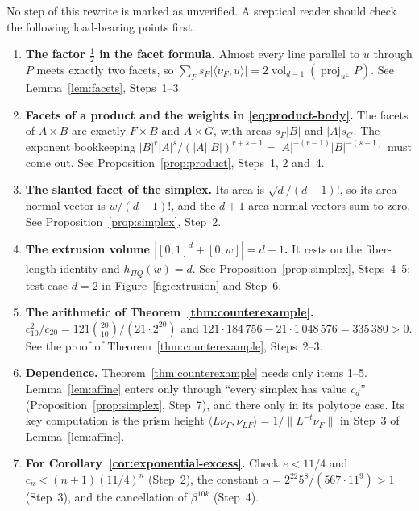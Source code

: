 \documentclass[11pt]{article}
\DeclareMathOperator{\vol}{vol}
\DeclareMathOperator{\proj}{proj}
\begin{document}
No step of this rewrite is marked as unverified. A sceptical reader should
check the following load-bearing points first.
\begin{enumerate}[leftmargin=2em,itemsep=3pt]
\item \textbf{The factor \(\tfrac12\) in the facet formula.} Almost every
 line parallel to \(u\) through \(P\) meets exactly two facets, so
 \(\sum_Fs_F|\langle\nu_F,u\rangle|=2\vol_{d-1}(\proj_{u^\perp}P)\).
 See Lemma~\ref{lem:facets}, Steps~1--3.
\item \textbf{Facets of a product and the weights in
 \eqref{eq:product-body}.} The facets of \(A\times B\) are exactly
 \(F\times B\) and \(A\times G\), with areas \(s_F|B|\) and \(|A|s_G\).
 The exponent bookkeeping
 \(|B|^r|A|^s/(|A||B|)^{r+s-1}=|A|^{-(r-1)}|B|^{-(s-1)}\) must come out.
 See Proposition~\ref{prop:product}, Steps~1, 2 and~4.
\item \textbf{The slanted facet of the simplex.} Its area is
 \(\sqrt d/(d-1)!\), so its area-normal vector is \(w/(d-1)!\), and the
 \(d+1\) area-normal vectors sum to zero. See
 Proposition~\ref{prop:simplex}, Step~2.
\item \textbf{The extrusion volume \(|[0,1]^d+[0,w]|=d+1\).} It rests on
 the fiber-length identity and \(h_{\Pi Q}(w)=d\). See
 Proposition~\ref{prop:simplex}, Steps~4--5; test case \(d=2\) in
 Figure~\ref{fig:extrusion} and Step~6.
\item \textbf{The arithmetic of Theorem~\ref{thm:counterexample}.}
 \(c_{10}^2/c_{20}=121\binom{20}{10}/(21\cdot2^{20})\) and
 \(121\cdot184\,756-21\cdot1\,048\,576=335\,380>0\). See the proof of
 Theorem~\ref{thm:counterexample}, Steps~2--3.
\item \textbf{Dependence.} Theorem~\ref{thm:counterexample} needs only
 items 1--5. Lemma~\ref{lem:affine} enters only through ``every simplex
 has value \(c_d\)'' (Proposition~\ref{prop:simplex}, Step~7), and there
 only in its polytope case. Its key computation is the prism height
 \(\langle L\nu_F,\nu_{LF}\rangle=1/\|L^{-t}\nu_F\|\) in Step~3 of
 Lemma~\ref{lem:affine}.
\item \textbf{For Corollary~\ref{cor:exponential-excess}.} Check
 \(e<11/4\) and \(c_n<(n+1)(11/4)^n\) (Step~2), the constant
 \(\alpha=2^{22}5^8/(567\cdot11^9)>1\) (Step~3), and the cancellation of
 \(\beta^{10k}\) (Step~4).
\end{enumerate}
\end{document}
